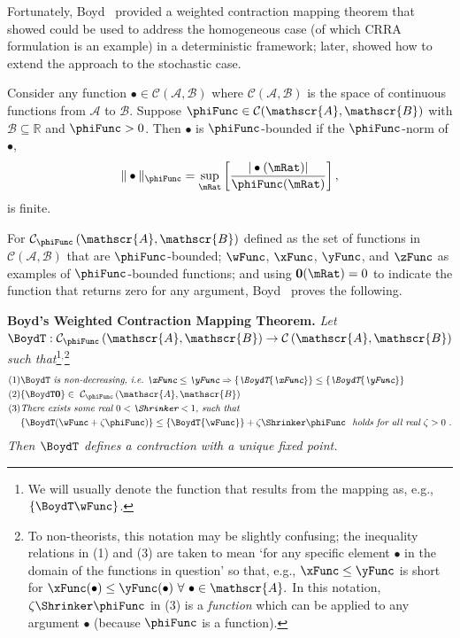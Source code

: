 \documentclass[BufferStockTheory]{subfiles}
\begin{document}
Fortunately, Boyd~\citeyearpar{jboydWeighted} provided a weighted contraction mapping theorem that \cite{asHomogeneous} showed could be used to address the homogeneous case (of which CRRA formulation is an example) in a deterministic framework; later, \cite{duranDiscounting} showed how to extend the \cite{jboydWeighted} approach to the stochastic case.
\begin{defn}
  Consider any function $\bullet\in \mathcal{C}(\mathscr{A},\mathscr{B})$ where $\mathcal{C}(\mathscr{A},\mathscr{B})$ is the space of continuous functions from $\mathscr{A}$ to $%
  \mathscr{B}$. Suppose $\phiFunc \in \mathcal{C}(\mathscr{A},\mathscr{B})$ with $%
  \mathscr{B}\subseteq\mathbb{R}$ and $\phiFunc >0$. Then $\bullet$ is $\phiFunc$-bounded if the $\phiFunc$-norm of $\bullet$,
  \begin{equation}
    \Vert \bullet\Vert _{\phiFunc }=\sup_{\mRat}\left[ \frac{|\bullet(\mRat)|}{\phiFunc (\mRat)}\right] ,
    \label{eq:phinorm}
  \end{equation}%
  is finite.
\end{defn}

For $\mathcal{C}_{\phiFunc }\left( \mathscr{A},\mathscr{B}\right) $
defined as the set of functions in
$\mathcal{C}(\mathscr{A},\mathscr{B})$ that are $\phiFunc$-bounded;
$\wFunc$, $\xFunc$, $\yFunc$, and $\zFunc$ as examples of
$\phiFunc$-bounded functions; and using $\mathbf{0}(\mRat)=0$ to
indicate the function that returns zero for any argument,
Boyd~\citeyearpar{jboydWeighted} proves the following.

\textbf{Boyd's Weighted Contraction Mapping Theorem.} \textit{Let $\BoydT:\mathcal{C}_{\phiFunc }\left( \mathscr{A},\mathscr{B}\right)
  \rightarrow \mathcal{C}\left( \mathscr{A},\mathscr{B}\right) $ such
  that}\footnote{We will usually denote the function that results from the mapping as, e.g., $\{\BoydT\wFunc\}$.}$^,$\footnote{To non-theorists, this notation may be slightly confusing; the inequality relations in (1) and (3) are taken to mean `for any specific element $\bullet$ in the domain of the functions in question' so that, e.g., $\xFunc \leq \yFunc$ is short for $\xFunc(\bullet) \leq \yFunc(\bullet)~\forall~\bullet\in \mathscr{A}.$  In this notation, $\zeta \Shrinker \phiFunc$ in (3) is a {\it function} which can be applied to any argument $\bullet$ (because $\phiFunc$ is a function).} \nopagebreak
\begin{align*}
  \mbox{(1)} &\BoydT%
               \mbox{ {\it is non-decreasing, i.e.\ ${\xFunc} \leq {\yFunc}\Rightarrow
               \{\BoydT{\xFunc}\} \leq \{\BoydT{\yFunc}\}$}}   \nonumber \\
  \mbox{(2)} & \{\BoydT\mathbf{0}\}\in ~ \mathcal{C}_{\phiFunc }\left(\mathscr{A},\mathscr{B}\right)  \notag \\
  \mbox{(3)}
             & \mbox{\it There exists some real $0 < \Shrinker < 1$, such that} \\
             & \{\BoydT({\wFunc} +\zeta\phiFunc )\} \leq \{\BoydT{\wFunc}\} +\zeta\Shrinker \phiFunc
               \mbox{ {\it ~holds for all real $\zeta > 0$} }.
\end{align*}%
\textit{Then $\BoydT$ defines a contraction with a unique fixed point.}
\end{document}
